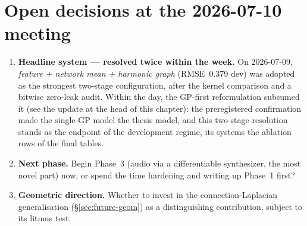 \documentclass[11pt,a4paper]{report}
\newcommand{\rmseHeadline}{0.379}      %
\newcommand{\rmseGP}{0.376}            %
\begin{document}
\section{Open decisions at the 2026-07-10 meeting}\label{sec:open-decisions}
\begin{enumerate}[leftmargin=*]
  \item \textbf{Headline system --- resolved twice within the week.} On 2026-07-09,
        \emph{feature + network mean + harmonic graph} (RMSE~\rmseHeadline{} dev)
        was adopted as the strongest two-stage configuration, after the kernel
        comparison and a bitwise zero-leak audit. Within the day, the GP-first
        reformulation subsumed it (see the update at the head of this chapter):
        the preregistered confirmation made the single-GP model the thesis model,
        and this two-stage resolution stands as the endpoint of the development
        regime, its systems the ablation rows of the final tables.
  \item \textbf{Next phase.} Begin Phase~3 (audio via a differentiable synthesizer,
        the most novel part) now, or spend the time hardening and writing up
        Phase~1 first?
  \item \textbf{Geometric direction.} Whether to invest in the connection-Laplacian
        generalisation (\S\ref{sec:future-geom}) as a distinguishing contribution,
        subject to its litmus test.
\end{enumerate}
\end{document}
